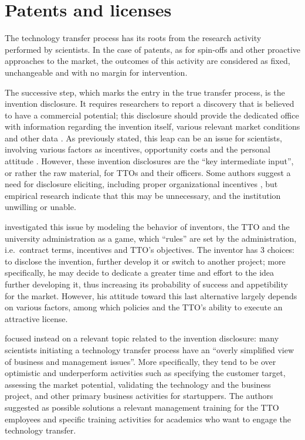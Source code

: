 \section{Patents and licenses}

The technology transfer process has its roots from the research activity performed by scientists. In the case of patents, as for spin-offs and other proactive approaches to the market, the outcomes of this activity are considered as fixed, unchangeable and with no margin for intervention. 

The successive step, which marks the entry in the true transfer process, is the invention disclosure. It requires researchers to report a discovery that is believed to have a commercial potential; this disclosure should provide the dedicated office with information regarding the invention itself, various relevant market conditions and other data \citep{Thursby2002}. As previously stated, this leap can be an issue for scientists, involving various factors as incentives, opportunity costs and the personal attitude \citep{OwenSmith2001}. However, these invention disclosures are the \enquote{key intermediate input}, or rather the raw material, for TTOs and their officers. Some authors suggest a need for disclosure eliciting, including proper organizational incentives \citep{Siegel2003a}, but empirical research indicate that this may be unnecessary, and the institution unwilling or unable. 

\citet{Jensen2003} investigated this issue by modeling the behavior of inventors, the TTO and the university administration as a game, which \enquote{rules} are set by the administration, i.e.\ contract terms, incentives and TTO's objectives. The inventor has 3 choices: to disclose the invention, further develop it or switch to another project; more specifically, he may decide to dedicate a greater time and effort to the idea further developing it, thus increasing its probability of success and appetibility for the market. However, his attitude toward this last alternative largely depends on various factors, among which policies and the TTO's ability to execute an attractive license.

\citet{McAdam2005} focused instead on a relevant topic related to the invention disclosure: many scientists initiating a technology transfer process have an \enquote{overly simplified view of business and management issues}. More specifically, they tend to be over optimistic and underperform activities such as specifying the customer target, assessing the market potential, validating the technology and the business project, and other primary business activities for startuppers. The authors suggested as possible solutions a relevant management training for the TTO employees and specific training activities for academics who want to engage the technology transfer.

